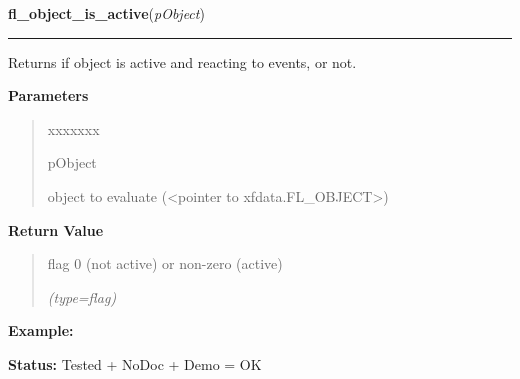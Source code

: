 \hspace{.8\funcindent}\begin{boxedminipage}{\funcwidth}

    \raggedright \textbf{fl\_object\_is\_active}(\textit{pObject})

    \vspace{-1.5ex}

    \rule{\textwidth}{0.5\fboxrule}
\setlength{\parskip}{2ex}
    Returns if object is active and reacting to events, or not.

\setlength{\parskip}{1ex}
      \textbf{Parameters}
      \vspace{-1ex}

      \begin{quote}
        \begin{Ventry}{xxxxxxx}

          \item[pObject]

          object to evaluate ({\textless}pointer to 
          xfdata.FL\_OBJECT{\textgreater})

        \end{Ventry}

      \end{quote}

      \textbf{Return Value}
    \vspace{-1ex}

      \begin{quote}
      flag 0 (not active) or non-zero (active)

      {\it (type=flag)}

      \end{quote}

\textbf{Example:} 

\textbf{Status:} Tested + NoDoc + Demo = OK



    \end{boxedminipage}

    \label{xformslib:library:fl_enumerate_fonts}

    \vspace{0.5ex}

